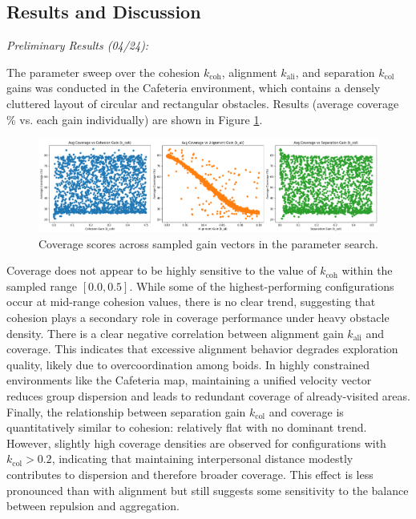 \documentclass[12pt]{article}
\begin{document}
\begin{linenumbers}
\section{Results and Discussion}

\emph{Preliminary Results (04/24):}

The parameter sweep over the cohesion \(k_\text{coh}\), alignment \(k_\text{ali}\), and separation \(k_\text{col}\) gains was conducted in the Cafeteria environment, which contains a densely cluttered layout of circular and rectangular obstacles. Results (average coverage \% vs. each gain individually) are shown in Figure \ref{fig:gains}.

\begin{figure}[h!]
\centering
\includegraphics[width=\linewidth]{gains.png}
\caption{Coverage scores across sampled gain vectors in the parameter search.}
\label{fig:gains}
\end{figure}

Coverage does not appear to be highly sensitive to the value of \(k_\text{coh}\) within the sampled range \([0.0, 0.5]\). While some of the highest-performing configurations occur at mid-range cohesion values, there is no clear trend, suggesting that cohesion plays a secondary role in coverage performance under heavy obstacle density. There is a clear negative correlation between alignment gain \(k_\text{ali}\) and coverage. This indicates that excessive alignment behavior degrades exploration quality, likely due to overcoordination among boids. In highly constrained environments like the Cafeteria map, maintaining a unified velocity vector reduces group dispersion and leads to redundant coverage of already-visited areas. Finally, the relationship between separation gain \(k_\text{col}\) and coverage is quantitatively similar to cohesion: relatively flat with no dominant trend. However, slightly high coverage densities are observed for configurations with \(k_\text{col} > 0.2\), indicating that maintaining interpersonal distance modestly contributes to dispersion and therefore broader coverage. This effect is less pronounced than with alignment but still suggests some sensitivity to the balance between repulsion and aggregation.


\end{linenumbers}
\end{document}
